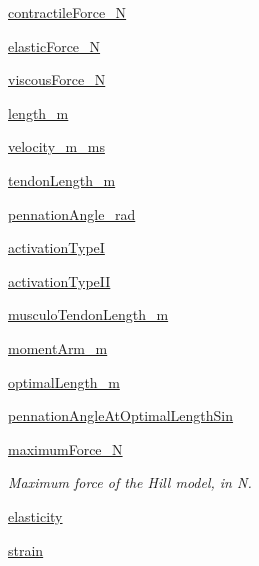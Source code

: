\begin{DoxyCompactItemize}
\item 
\hyperlink{class_muscle_hill_1_1_muscle_hill_a8a1d022609680dff9b3efae94eba8f38}{contractile\+Force\+\_\+N}
\item 
\hyperlink{class_muscle_hill_1_1_muscle_hill_a9ea6475af661c041ccb08fb864aa6ec9}{elastic\+Force\+\_\+N}
\item 
\hyperlink{class_muscle_hill_1_1_muscle_hill_ab348f7ba65edad4ff12f2a7ab762efba}{viscous\+Force\+\_\+N}
\item 
\hyperlink{class_muscle_hill_1_1_muscle_hill_a191b0ea955fc961f744be53c4e815d40}{length\+\_\+m}
\item 
\hyperlink{class_muscle_hill_1_1_muscle_hill_a76789511bcadf11f1aa14d33a6338461}{velocity\+\_\+m\+\_\+ms}
\item 
\hyperlink{class_muscle_hill_1_1_muscle_hill_ad9b98e7edcdd9baeab4eab970b8c15f0}{tendon\+Length\+\_\+m}
\item 
\hyperlink{class_muscle_hill_1_1_muscle_hill_ae1b3664f0f24c6859d437afcb69dab5f}{pennation\+Angle\+\_\+rad}
\item 
\hyperlink{class_muscle_hill_1_1_muscle_hill_ae97a1150112bf957c9c40a1f6acb5fe3}{activation\+TypeI}
\item 
\hyperlink{class_muscle_hill_1_1_muscle_hill_af8804528feb82183f9dc36be3f8add31}{activation\+Type\+II}
\item 
\hyperlink{class_muscle_hill_1_1_muscle_hill_a6b615b78ce60501d8231974115ad7d9c}{musculo\+Tendon\+Length\+\_\+m}
\item 
\hyperlink{class_muscle_hill_1_1_muscle_hill_af8d3e20d106fb65cb984644c8d6df418}{moment\+Arm\+\_\+m}
\item 
\hyperlink{class_muscle_hill_1_1_muscle_hill_a36f410007232d947d44cd7dc7b5369eb}{optimal\+Length\+\_\+m}
\item 
\hyperlink{class_muscle_hill_1_1_muscle_hill_a22986f7a2c23975ebeffe7b8c3679187}{pennation\+Angle\+At\+Optimal\+Length\+Sin}
\item 
\hyperlink{class_muscle_hill_1_1_muscle_hill_aae70340f27634c6246b6e58940e37590}{maximum\+Force\+\_\+N}
\begin{DoxyCompactList}\small\item\em Maximum force of the Hill model, in N. \end{DoxyCompactList}\item 
\hyperlink{class_muscle_hill_1_1_muscle_hill_a1fa2820c80232c80b9438cabd85919ed}{elasticity}
\item 
\hyperlink{class_muscle_hill_1_1_muscle_hill_a785b8df0d6830e6be1f00e69cac4058e}{strain}

\end{DoxyCompactItemize}
